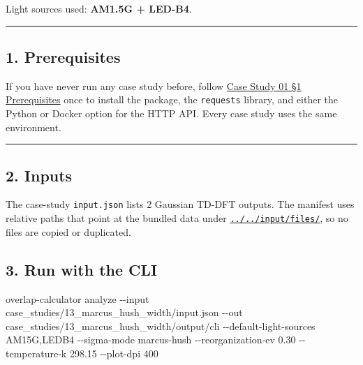 \documentclass[
  11pt,
]{article}
\newenvironment{Shaded}{}{}
\newcommand{\AttributeTok}[1]{\textcolor[rgb]{0.49,0.56,0.16}{#1}}
\newcommand{\ExtensionTok}[1]{#1}
\newcommand{\NormalTok}[1]{#1}
\begin{document}
Light sources used: \textbf{AM1.5G + LED-B4}.

\begin{center}\rule{0.5\linewidth}{0.5pt}\end{center}

\hypertarget{1-prerequisites}{
\subsection{1. Prerequisites}\label{1-prerequisites}}

If you have never run any case study before, follow
\href{https://github.com/pinarsyt/overlap-calculator/blob/main/case_studies/01_theoretical_only/README.md\#1-prerequisites}{Case
Study 01 \S1 Prerequisites} once to install the package, the
\texttt{requests} library, and either the Python or Docker option for
the HTTP API. Every case study uses the same environment.

\begin{center}\rule{0.5\linewidth}{0.5pt}\end{center}

\hypertarget{2-inputs}{
\subsection{2. Inputs}\label{2-inputs}}

The case-study \texttt{input.json} lists 2 Gaussian TD-DFT outputs. The
manifest uses relative paths that point at the bundled data under
\href{https://github.com/pinarsyt/overlap-calculator/blob/main/input/files}{\texttt{../../input/files/}},
so no files are copied or duplicated.

\hypertarget{3-run-with-the-cli}{
\subsection{3. Run with the CLI}\label{3-run-with-the-cli}}

\begin{Shaded}
\begin{Highlighting}[]
\ExtensionTok{overlap{-}calculator}\NormalTok{ analyze }\AttributeTok{{-}{-}input}\NormalTok{ case\_studies/13\_marcus\_hush\_width/input.json }\AttributeTok{{-}{-}out}\NormalTok{ case\_studies/13\_marcus\_hush\_width/output/cli }\AttributeTok{{-}{-}default{-}light{-}sources}\NormalTok{ AM15G,LEDB4 }\AttributeTok{{-}{-}sigma{-}mode}\NormalTok{ marcus-hush }\AttributeTok{{-}{-}reorganization{-}ev}\NormalTok{ 0.30 }\AttributeTok{{-}{-}temperature{-}k}\NormalTok{ 298.15 }\AttributeTok{{-}{-}plot{-}dpi}\NormalTok{ 400}
\end{Highlighting}
\end{Shaded}
\end{document}
